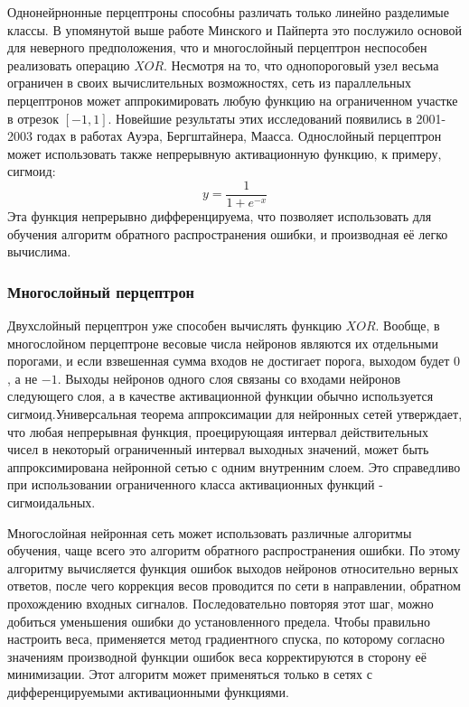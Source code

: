 \documentclass[a4paper,12pt]{report}
\begin{document}
Однонейрнонные перцептроны способны различать только линейно разделимые классы. В упомянутой выше работе Минского и Пайперта это послужило основой для неверного предположения, что и многослойный перцептрон неспособен реализовать операцию $XOR$. Несмотря на то, что однопороговый узел весьма ограничен в своих вычислительных возможностях,  сеть из параллельных перцептронов может аппрокимировать любую функцию на ограниченном участке в отрезок $[-1,1]$. Новейшие результаты этих исследований появились в 2001-2003 годах в работах Ауэра, Бергштайнера, Маасса. Однослойный перцептрон может использовать также непрерывную активационную функцию, к примеру, сигмоид:
\begin{equation}
y=\frac{1}{1+e^{-x}}
\end{equation}
Эта функция непрерывно дифференцируема, что позволяет использовать для обучения алгоритм обратного распространения ошибки, и производная её легко вычислима.

\subsubsection{Многослойный перцептрон}
Двухслойный перцептрон уже способен вычислять функцию $XOR$. Вообще, в многослойном перцептроне весовые числа нейронов являются их отдельными порогами, и если взвешенная сумма входов  не достигает порога, выходом будет $0$, а не $-1$. Выходы нейронов одного слоя связаны со входами нейронов следующего слоя, а в качестве активационной функции обычно используется сигмоид.Универсальная теорема аппроксимации для нейронных сетей утверждает, что любая непрерывная функция, проецирующаяя интервал действительных чисел в  некоторый ограниченный интервал выходных значений, может быть аппроксимирована нейронной сетью с одним внутренним слоем. Это справедливо при использовании ограниченного класса активационных функций - сигмоидальных.

Многослойная нейронная сеть может использовать различные алгоритмы обучения, чаще всего это алгоритм обратного распространения ошибки. По этому алгоритму вычисляется функция ошибок выходов нейронов относительно верных ответов, после чего коррекция весов проводится по сети в направлении, обратном прохождению входных сигналов. Последовательно повторяя этот шаг, можно добиться уменьшения ошибки до установленного предела. Чтобы правильно настроить веса, применяется метод градиентного спуска, по которому согласно значениям производной функции ошибок веса корректируются в сторону её минимизации. Этот алгоритм может применяться только в сетях с дифференцируемыми активационными функциями.
\end{document}
